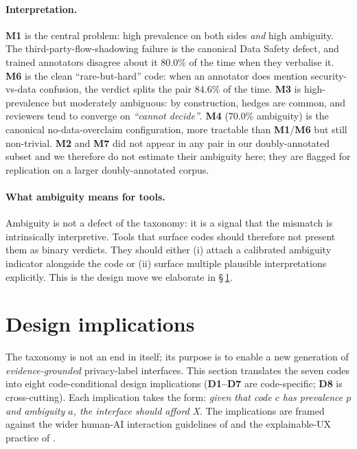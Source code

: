 \documentclass[11pt,a4paper]{article}
\newcommand{\code}[1]{\textsf{\textbf{#1}}}
\begin{document}
\paragraph{Interpretation.}
\code{M1} is the central problem: high prevalence on both sides
\emph{and} high ambiguity. The third-party-flow-shadowing failure is
the canonical Data Safety defect, and trained annotators disagree
about it $80.0\%$ of the time when they verbalise it. \code{M6} is
the clean ``rare-but-hard'' code: when an annotator does mention
security-vs-data confusion, the verdict splits the pair $84.6\%$ of
the time. \code{M3} is high-prevalence but moderately ambiguous: by
construction, hedges are common, and reviewers tend to converge on
\emph{``cannot decide''}. \code{M4} ($70.0\%$ ambiguity) is the
canonical no-data-overclaim configuration, more tractable than
\code{M1}/\code{M6} but still non-trivial. \code{M2} and \code{M7}
did not appear in any pair in our doubly-annotated subset and we
therefore do not estimate their ambiguity here; they are flagged for
replication on a larger doubly-annotated corpus.

\paragraph{What ambiguity means for tools.}
Ambiguity is not a defect of the taxonomy: it is a signal that the
mismatch is intrinsically interpretive. Tools that surface codes
should therefore not present them as binary verdicts. They should
either (i) attach a calibrated ambiguity indicator alongside the code
or (ii) surface multiple plausible interpretations explicitly. This
is the design move we elaborate in \S\,\ref{sec:design}.

\section{Design implications}\label{sec:design}

The taxonomy is not an end in itself; its purpose is to enable a new
generation of \emph{evidence-grounded} privacy-label interfaces.
This section translates the seven codes into eight code-conditional
design implications (\textbf{D1--D7} are code-specific; \textbf{D8} is
cross-cutting). Each implication takes the form: \emph{given that
code $c$ has prevalence $p$ and ambiguity $a$, the interface should
afford X}. The implications are framed against the wider human-AI
interaction guidelines of \citet{amershi2019guidelines} and the
explainable-UX practice of \citet{liao2020questioning}.
\end{document}
